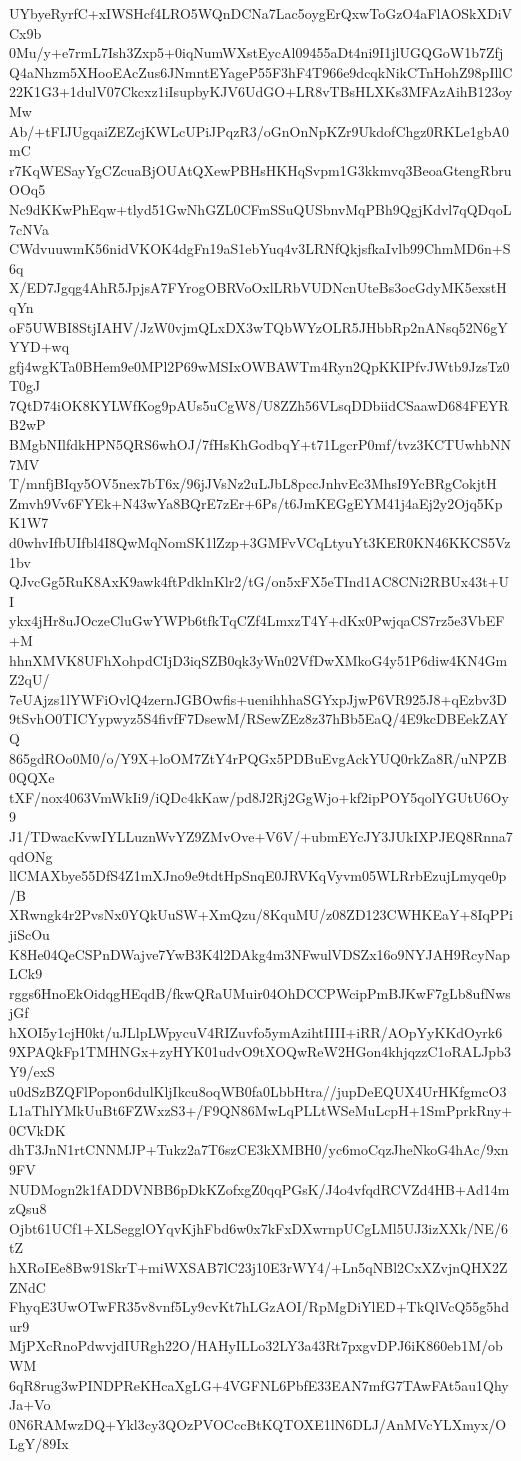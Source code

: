 UYbyeRyrfC+xIWSHcf4LRO5WQnDCNa7Lac5oygErQxwToGzO4aFlAOSkXDiVCx9b
0Mu/y+e7rmL7Ish3Zxp5+0iqNumWXstEycAl09455aDt4ni9I1jlUGQGoW1b7Zfj
Q4aNhzm5XHooEAcZus6JNmntEYageP55F3hF4T966e9dcqkNikCTnHohZ98pIllC
22K1G3+1dulV07Ckcxz1iIsupbyKJV6UdGO+LR8vTBsHLXKs3MFAzAihB123oyMw
Ab/+tFIJUgqaiZEZcjKWLcUPiJPqzR3/oGnOnNpKZr9UkdofChgz0RKLe1gbA0mC
r7KqWESayYgCZcuaBjOUAtQXewPBHsHKHqSvpm1G3kkmvq3BeoaGtengRbruOOq5
Nc9dKKwPhEqw+tlyd51GwNhGZL0CFmSSuQUSbnvMqPBh9QgjKdvl7qQDqoL7cNVa
CWdvuuwmK56nidVKOK4dgFn19aS1ebYuq4v3LRNfQkjsfkaIvlb99ChmMD6n+S6q
X/ED7Jgqg4AhR5JpjsA7FYrogOBRVoOxlLRbVUDNcnUteBs3ocGdyMK5exstHqYn
oF5UWBI8StjIAHV/JzW0vjmQLxDX3wTQbWYzOLR5JHbbRp2nANsq52N6gYYYD+wq
gfj4wgKTa0BHem9e0MPl2P69wMSIxOWBAWTm4Ryn2QpKKIPfvJWtb9JzsTz0T0gJ
7QtD74iOK8KYLWfKog9pAUs5uCgW8/U8ZZh56VLsqDDbiidCSaawD684FEYRB2wP
BMgbNIlfdkHPN5QRS6whOJ/7fHsKhGodbqY+t71LgcrP0mf/tvz3KCTUwhbNN7MV
T/mnfjBIqy5OV5nex7bT6x/96jJVsNz2uLJbL8pccJnhvEc3MhsI9YcBRgCokjtH
Zmvh9Vv6FYEk+N43wYa8BQrE7zEr+6Ps/t6JmKEGgEYM41j4aEj2y2Ojq5KpK1W7
d0whvIfbUIfbl4I8QwMqNomSK1lZzp+3GMFvVCqLtyuYt3KER0KN46KKCS5Vz1bv
QJvcGg5RuK8AxK9awk4ftPdklnKlr2/tG/on5xFX5eTInd1AC8CNi2RBUx43t+UI
ykx4jHr8uJOczeCluGwYWPb6tfkTqCZf4LmxzT4Y+dKx0PwjqaCS7rz5e3VbEF+M
hhnXMVK8UFhXohpdCIjD3iqSZB0qk3yWn02VfDwXMkoG4y51P6diw4KN4GmZ2qU/
7eUAjzs1lYWFiOvlQ4zernJGBOwfis+uenihhhaSGYxpJjwP6VR925J8+qEzbv3D
9tSvhO0TICYypwyz5S4fivfF7DsewM/RSewZEz8z37hBb5EaQ/4E9kcDBEekZAYQ
865gdROo0M0/o/Y9X+loOM7ZtY4rPQGx5PDBuEvgAckYUQ0rkZa8R/uNPZB0QQXe
tXF/nox4063VmWkIi9/iQDc4kKaw/pd8J2Rj2GgWjo+kf2ipPOY5qolYGUtU6Oy9
J1/TDwacKvwIYLLuznWvYZ9ZMvOve+V6V/+ubmEYcJY3JUkIXPJEQ8Rnna7qdONg
llCMAXbye55DfS4Z1mXJno9e9tdtHpSnqE0JRVKqVyvm05WLRrbEzujLmyqe0p/B
XRwngk4r2PvsNx0YQkUuSW+XmQzu/8KquMU/z08ZD123CWHKEaY+8IqPPijiScOu
K8He04QeCSPnDWajve7YwB3K4l2DAkg4m3NFwulVDSZx16o9NYJAH9RcyNapLCk9
rggs6HnoEkOidqgHEqdB/fkwQRaUMuir04OhDCCPWcipPmBJKwF7gLb8ufNwsjGf
hXOI5y1cjH0kt/uJLlpLWpycuV4RIZuvfo5ymAzihtIIII+iRR/AOpYyKKdOyrk6
9XPAQkFp1TMHNGx+zyHYK01udvO9tXOQwReW2HGon4khjqzzC1oRALJpb3Y9/exS
u0dSzBZQFlPopon6dulKljIkcu8oqWB0fa0LbbHtra//jupDeEQUX4UrHKfgmcO3
L1aThlYMkUuBt6FZWxzS3+/F9QN86MwLqPLLtWSeMuLcpH+1SmPprkRny+0CVkDK
dhT3JnN1rtCNNMJP+Tukz2a7T6szCE3kXMBH0/yc6moCqzJheNkoG4hAc/9xn9FV
NUDMogn2k1fADDVNBB6pDkKZofxgZ0qqPGsK/J4o4vfqdRCVZd4HB+Ad14mzQsu8
Ojbt61UCf1+XLSegglOYqvKjhFbd6w0x7kFxDXwrnpUCgLMl5UJ3izXXk/NE/6tZ
hXRoIEe8Bw91SkrT+miWXSAB7lC23j10E3rWY4/+Ln5qNBl2CxXZvjnQHX2ZZNdC
FhyqE3UwOTwFR35v8vnf5Ly9cvKt7hLGzAOI/RpMgDiYlED+TkQlVcQ55g5hdur9
MjPXcRnoPdwvjdIURgh22O/HAHyILLo32LY3a43Rt7pxgvDPJ6iK860eb1M/obWM
6qR8rug3wPINDPReKHcaXgLG+4VGFNL6PbfE33EAN7mfG7TAwFAt5au1QhyJa+Vo
0N6RAMwzDQ+Ykl3cy3QOzPVOCccBtKQTOXE1lN6DLJ/AnMVcYLXmyx/OLgY/89Ix
